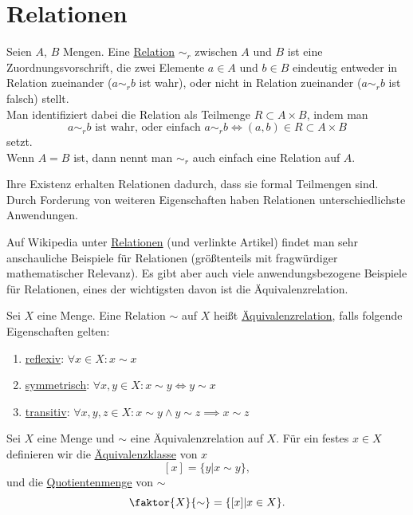 \section{Relationen}

\begin{definition}[Relation]
    Seien $A$, $B$ Mengen. Eine \underline{Relation} $\sim_r$ zwischen $A$ und $B$ ist eine Zuordnungsvorschrift, die zwei Elemente $a \in A$ und $b \in B$ eindeutig entweder in Relation zueinander ($a \sim_r b$ ist wahr), oder nicht in Relation zueinander ($a \sim_r b$ ist falsch) stellt.\\
    Man identifiziert dabei die Relation als Teilmenge $R \subset A \times B$, indem man
    $$a \sim_r b \text{ ist wahr, oder einfach } a \sim_r b \iff (a,b) \in R \subset A \times B$$
    setzt.\\
    Wenn $A = B$ ist, dann nennt man $\sim_r$ auch einfach eine Relation auf $A$.
\end{definition}

Ihre Existenz erhalten Relationen dadurch, dass sie formal Teilmengen sind. Durch Forderung von weiteren Eigenschaften haben Relationen unterschiedlichste Anwendungen.

Auf Wikipedia unter \href{https://de.wikipedia.org/wiki/Relation_(Mathematik)#Beispiele}{Relationen} (und verlinkte Artikel) findet man sehr anschauliche Beispiele für Relationen (größtenteils mit fragwürdiger mathematischer Relevanz). Es gibt aber auch viele anwendungsbezogene Beispiele für Relationen, eines der wichtigsten davon ist die Äquivalenzrelation.

\begin{definition}[Äquivalenzrelation] %
    Sei $X$ eine Menge. Eine Relation $\sim$ auf $X$ heißt \underline{Äquivalenzrelation}, falls folgende Eigenschaften gelten:
    \begin{enumerate}[label=(Ä\arabic*)]
        \item \underline{reflexiv}: $\forall x \in X: x \sim x$
        \item \underline{symmetrisch}: $\forall x, y \in X: x \sim y \iff y \sim x$
        \item \underline{transitiv}: $\forall x, y, z \in X: x \sim y \land y \sim z \implies x \sim z$
    \end{enumerate}
\end{definition}

\begin{definition}[Äquivalenzklassen]
    \label{def-equivalence-class}
    Sei $X$ eine Menge und $\sim$ eine Äquivalenzrelation auf $X$. Für ein festes $x \in X$ definieren wir die \underline{Äquivalenzklasse} von $x$
    $$[x] = \{y | x \sim y \},$$
    und die \underline{Quotientenmenge} von $\sim$
    $$\faktor{X}{\sim} = \{ [x] | x \in X \}.$$
\end{definition}

